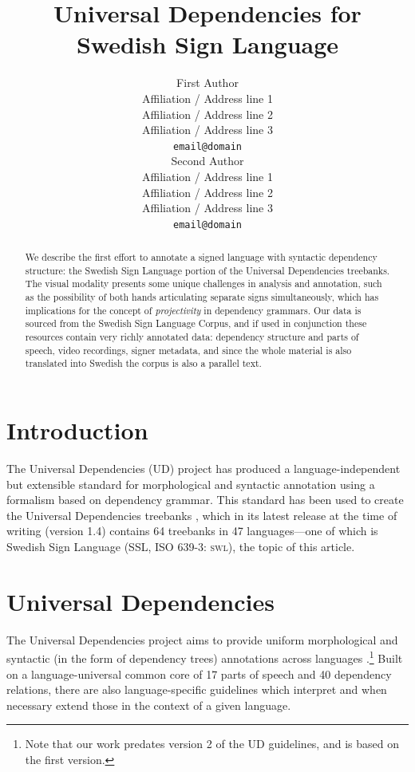 \documentclass[11pt]{article}
\title{Universal Dependencies for Swedish Sign Language}
\author{First Author \\
  Affiliation / Address line 1 \\
  Affiliation / Address line 2 \\
  Affiliation / Address line 3 \\
  {\tt email@domain} \\\And
  Second Author \\
  Affiliation / Address line 1 \\
  Affiliation / Address line 2 \\
  Affiliation / Address line 3 \\
  {\tt email@domain} \\}
\date{}
\begin{document}
\maketitle
\begin{abstract}
    We describe the first effort to annotate a signed language with syntactic
    dependency structure: the Swedish Sign Language portion of the
    Universal Dependencies treebanks.
    The visual modality presents some unique challenges in analysis and
    annotation, such as the possibility of
    both hands articulating separate signs simultaneously, which has
    implications for the concept of \emph{projectivity} in dependency grammars.
    Our data is sourced from the Swedish Sign Language Corpus,
    and if used in conjunction these resources contain very richly
    annotated data: dependency structure and parts of speech,
    video recordings, signer metadata, and since the whole material is
    also translated into Swedish the corpus is also a parallel text.
\end{abstract}

\section{Introduction}

The Universal Dependencies (UD) project \cite{Nivre2016ud} 
has produced a language-independent but extensible standard for
morphological and syntactic annotation using a formalism based on
dependency grammar. This standard has been used to create the Universal
Dependencies treebanks \cite{ud14}, which in its latest release at the time of
writing (version 1.4) contains 64 treebanks in 47 languages---one of which is
Swedish Sign Language (SSL, ISO 639-3: \textsc{swl}), the topic of this
article.


\section{Universal Dependencies}

The Universal Dependencies project aims to provide uniform morphological and
syntactic (in the form of dependency trees) annotations across languages
\cite{Nivre2016ud}.\footnote{Note that our work predates version 2 of the UD
guidelines, and is based on the first version.}
Built on a language-universal common core of 17 parts of speech and
40 dependency relations, there are also language-specific guidelines which
interpret and when necessary extend those in the context of a given language.
\end{document}
